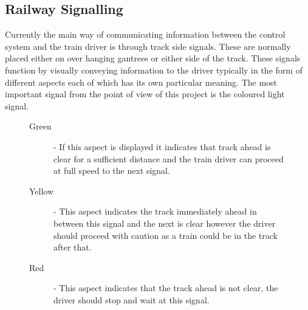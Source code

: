 \begin{comment}
A point is a physical piece of equipment that is used to 
form a junction. Due to the nature of the rails and trains it is not possible to physically
to just join two segments of track. Instead a point is needed to act as
physical switch controlling the flow of trains through a junction. A point
has two positions which are referred to as \textbf{normal} and
\textbf{reverse}. This presents a safety hazard, for example see figure \ref{fig:track}, if a train enters
the junction $B$ from $C$ when the junction is locked in the
position for normal then the train will be derailed. 
\end{comment}


\subsection{Railway Signalling}
Currently the main way of communicating information between the control system and the train driver is through track side signals. These are normally placed either on over hanging gantrees or either side of the track. These signals function by visually conveying information to the driver typically in the form of different  aspects each of which has its own particular meaning. The most important signal from the point of view of this project is the coloured light signal.

\begin{comment}
Signals are the main means used to communicate information regarding the state
of the track ahead of the train. Typically they are placed either on the track
side or over hanging the railway. Visual indications known as aspects are used
to convey information to the driver. A signal will have many such aspects
which can be displayed, each with a particular meaning. The main type of signal
considered in this project is the coloured light signal. Typically these have
between one - four aspects each conveying a different indication about the state of
the track ahead. Below is a description of the
aspects used for a three light signal.  
\end{comment}

\begin{figure}[h!]
\begin{description}

\item[Green] - If this aspect is displayed it indicates that track ahead is
  clear for a sufficient distance and the train driver
  can proceed at full speed to the next signal.

\item[Yellow] - This aspect indicates the track immediately ahead in between
  this signal and the next is clear however the driver should proceed with
  caution as a train could be in the track after that.

\item[Red] - This aspect indicates that the track ahead is not clear, the
  driver should stop and wait at this signal.

\end{description}
\label{fig:3lightsignal}


\end{figure}

